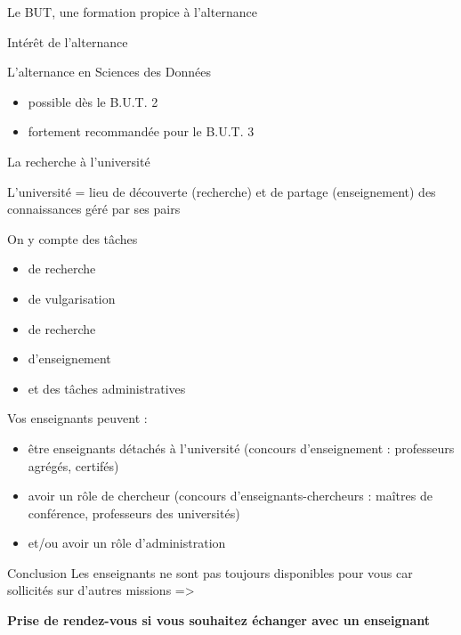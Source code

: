 \documentclass [xcolor=x11names,t] {beamer}
\begin{document}
\begin{frame}{Le BUT, une formation propice à l'alternance}
\begin{block}{Intérêt de l'alternance}
\end{block}

\begin{block}{L'alternance en Sciences des Données}
    \begin{itemize}
        \item possible dès le B.U.T. 2
        \item fortement recommandée pour le B.U.T. 3
    \end{itemize}
\end{block}

\end{frame}

\begin{frame}{La recherche à l'université}
   
    \begin{block}{L’université = lieu de découverte (recherche) et de partage (enseignement) des connaissances géré par ses pairs}

\begin{minipage}{0.35\textwidth}
        On y compte des tâches 
        \begin{itemize}
            \item de recherche
            \item de vulgarisation
            \item de recherche
            \item  d’enseignement
            \item  et des tâches administratives
        \end{itemize}
\end{minipage}\hfill
\begin{minipage}{0.61\textwidth}
Vos enseignants peuvent :
\begin{itemize}
    \item être enseignants détachés à l’université (concours d’enseignement : professeurs agrégés, certifés)
    \item avoir un rôle de chercheur (concours d’enseignants-chercheurs : maîtres de conférence, professeurs des universités)
    \item et/ou avoir un rôle d’administration
\end{itemize}

\end{minipage}

    \end{block}
\begin{alertblock}{Conclusion}
Les enseignants ne sont pas toujours disponibles pour vous car sollicités sur d’autres missions 
=> 

\textbf{Prise de rendez-vous si vous souhaitez échanger avec un enseignant}
    
\end{alertblock}
    
\end{frame}
\end{document}
